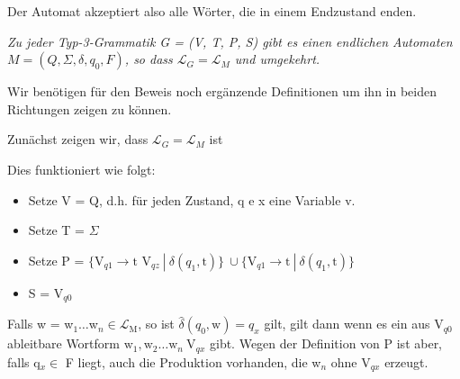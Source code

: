 \documentclass[11pt, a4paper]{article}
\newcommand{\Lagr}{\mathcal{L}}
\begin{document}
\begin{flushleft}
\begin{tcolorbox}[title = Definition 3.3]
        Der Automat akzeptiert also alle Wörter, die in einem Endzustand enden.
    \end{tcolorbox}

    \begin{tcolorbox}[title = Satz 3.1]
        \textit{Zu jeder Typ-3-Grammatik G = (V, T, P, S) gibt es einen endlichen Automaten \(M = (Q, \Sigma, \delta, q_0, F)\), so dass \(\Lagr_G = \Lagr_M\) und umgekehrt.}
    \end{tcolorbox}


    Wir benötigen für den Beweis noch ergänzende Definitionen um ihn in beiden Richtungen zeigen zu können.

    Zunächst zeigen wir, dass \(\Lagr_G = \Lagr_M\) ist

    Dies funktioniert wie folgt:

    \begin{itemize}[-]
        \item Setze V = Q, d.h. für jeden Zustand, q e x eine Variable v.
        \item Setze T = \(\Sigma\)
        \item Setze P = \(\{\text{V}_{q1} \rightarrow \text{t V}_{qz} \ |\  \delta(q_1, \text{t})\}\ \cup \{\text{V}_{q1} \rightarrow \text{t}\ |\  \delta(q_1, \text{t})\}\)
        \item S = V\(_{q0}\)
    \end{itemize}

    Falls w = w\(_1\ldots\)w\(_n \in \Lagr_\text{M}\), so ist \(\hat{\delta}(q_0, \text{w}) = q_x\) gilt, gilt dann wenn es ein aus V\(_{q0}\) ableitbare Wortform \(\text{w}_1, \text{w}_2\ldots\text{w}_n \ \text{V}_{qx}\) gibt. Wegen der Definition von P ist aber, falls q\(_x\in\) F liegt, auch die Produktion vorhanden, die w\(_n\) ohne V\(_{qx}\) erzeugt.


\end{flushleft}
\end{document}
